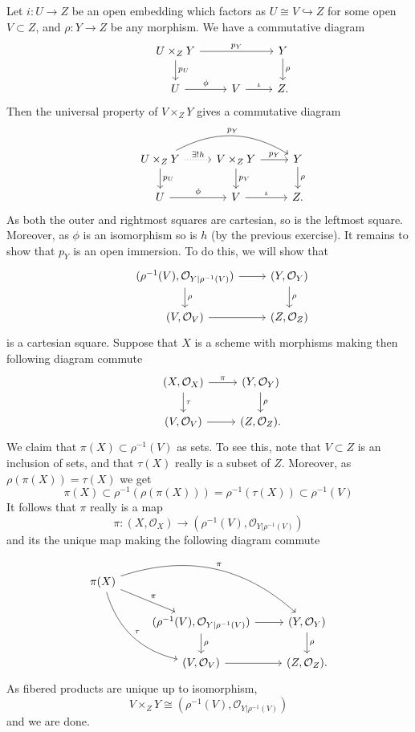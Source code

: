 \documentclass{article}
\theoremstyle{definition}
\begin{document}
Let $i : U \to Z$ be an open embedding which factors as $U \cong V
	\hookrightarrow Z$ for some open $V \subset Z$, and $\rho : Y \to Z$ be any
morphism. We have a commutative diagram
\[
	\begin{tikzcd}
		& U \times_Z Y
		\ar[rr, "p_Y"]
		\ar[d, "p_U"]
		&
		&
		Y
		\ar[d, "\rho"] \\
		& U
		\ar[r, "\phi"]
		& V
		\ar[r, "\iota"]
		& Z.
	\end{tikzcd}
\]
Then the universal property of $V \times_Z Y$ gives a commutative diagram
\[
	\begin{tikzcd}
		& U \times_Z Y
		\ar[rr, "p_Y", bend left=30]
		\ar[r, "\exists ! h", dotted]
		\ar[d, "p_U"]
		&
		V \times_Z Y
		\ar[r, "p_Y"]
		\ar[d, "p_V"]
		&
		Y
		\ar[d, "\rho"] \\
		& U
		\ar[r, "\phi"]
		& V
		\ar[r, "\iota"]
		& Z.
	\end{tikzcd}
\]
As both the outer and rightmost squares are cartesian, so is the leftmost
square. Moreover, as $\phi$ is an isomorphism so is $h$ (by the previous
exercise). It remains to show that $p_Y$ is an open immersion. To do this, we
will show that
\[
	\begin{tikzcd}
		& (\rho^{-1}(V), \mathcal{O}_{Y \vert \rho^{-1}(V)})
		\ar[r, ""]
		\ar[d, "\rho"]
		& (Y, \mathcal{O}_{Y})
		\ar[d, "\rho"] \\
		& (V, \mathcal{O}_V)
		\ar[r, ""]
		& (Z, \mathcal{O}_Z)
	\end{tikzcd}
\]
is a cartesian square. Suppose that $X$ is a scheme with morphisms making then
following diagram commute
\[
	\begin{tikzcd}
		& (X, \mathcal{O}_X)
		\ar[r, "\pi"]
		\ar[d, "\tau"]
		& (Y, \mathcal{O}_{Y})
		\ar[d, "\rho"] \\
		& (V, \mathcal{O}_V)
		\ar[r, ""]
		& (Z, \mathcal{O}_Z).
	\end{tikzcd}
\]
We claim that $\pi(X) \subset \rho^{-1}(V)$ as sets. To see this, note that $V
	\subset Z$ is an inclusion of sets, and that $\tau(X)$ really is a subset of
$Z$. Moreover, as $\rho(\pi(X)) = \tau(X)$ we get
\[
	\pi(X)
	\subset
	\rho^{-1}(\rho(\pi(X)))
	=
	\rho^{-1}(\tau(X))
	\subset
	\rho^{-1}(V)
\]
It follows that $\pi$ really is a map
\[
	\pi : (X, \mathcal{O}_X) \to (\rho^{-1}(V), \mathcal{O}_{Y \vert \rho^{-1}(V)})
\]
and its the unique map making the following diagram commute
\[
	\begin{tikzcd}
		\pi(X)
		\ar[dr, "\pi"]
		\ar[drr, "\pi", bend left=30]
		\ar[ddr, "\tau", bend right=30] \\
		& (\rho^{-1}(V), \mathcal{O}_{Y \vert \rho^{-1}(V)})
		\ar[r, ""]
		\ar[d, "\rho"]
		& (Y, \mathcal{O}_{Y})
		\ar[d, "\rho"] \\
		& (V, \mathcal{O}_V)
		\ar[r, ""]
		& (Z, \mathcal{O}_Z).
	\end{tikzcd}
\]
As fibered products are unique up to isomorphism,
\[
	V \times_Z Y
	\cong
	(\rho^{-1}(V), \mathcal{O}_{Y \vert \rho^{-1}(V)})
\]
and we are done.
\end{document}
